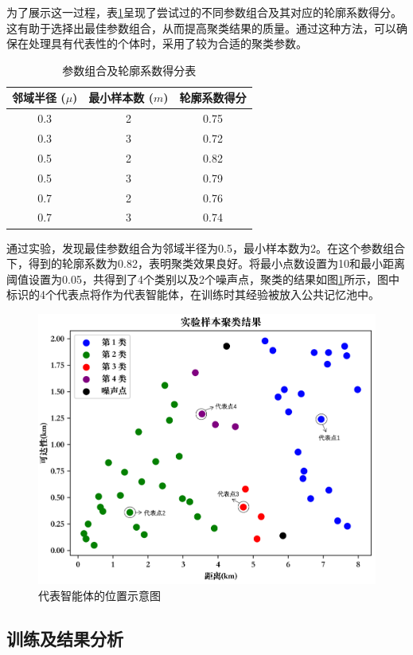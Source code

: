 为了展示这一过程，表\ref{tab_cluster}呈现了尝试过的不同参数组合及其对应的轮廓系数得分。这有助于选择出最佳参数组合，从而提高聚类结果的质量。通过这种方法，可以确保在处理具有代表性的个体时，采用了较为合适的聚类参数。

\renewcommand{\arraystretch}{1.2} %
\setlength{\tabcolsep}{8mm}
\begin{table}[htbp]
\centering
\caption{参数组合及轮廓系数得分表}
\label{tab_cluster}
\begin{tabular}{ccc}
\toprule
邻域半径 ($\mu$) & 最小样本数 ($m$) & 轮廓系数得分       \\
\midrule
0.3 & 2 & 0.75 \\ 
0.3 & 3 & 0.72 \\ 
0.5 & 2 & 0.82 \\ 
0.5 & 3 & 0.79 \\ 
0.7 & 2 & 0.76 \\ 
0.7 & 3 & 0.74 \\ 

\bottomrule
\end{tabular}
\end{table}

通过实验，发现最佳参数组合为邻域半径为0.5，最小样本数为2。在这个参数组合下，得到的轮廓系数为0.82，表明聚类效果良好。将最小点数设置为10和最小距离阈值设置为0.05，共得到了4个类别以及2个噪声点，聚类的结果如图\ref{db_cluster}所示，图中标识的4个代表点将作为代表智能体，在训练时其经验被放入公共记忆池中。
\begin{figure}[H]
  \centering
  \includegraphics[width=.75\linewidth]{figures/content/db_cluster.png}
  \caption{代表智能体的位置示意图}
  \label{db_cluster}
\end{figure}


\subsection{训练及结果分析}

